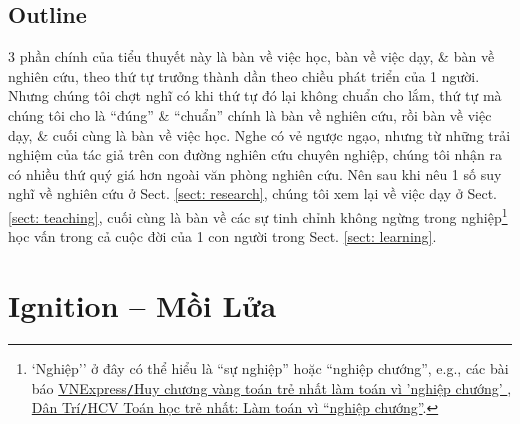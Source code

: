 \documentclass[12pt]{article}
\begin{document}
\subsection{Outline}
3 phần chính của tiểu thuyết này là bàn về việc học, bàn về việc dạy, \& bàn về nghiên cứu, theo thứ tự trưởng thành dần theo chiều phát triển của 1 người. Nhưng chúng tôi chợt nghĩ có khi thứ tự đó lại không chuẩn cho lắm, thứ tự mà chúng tôi cho là ``đúng'' \& ``chuẩn'' chính là bàn về nghiên cứu, rồi bàn về việc dạy, \& cuối cùng là bàn về việc học. Nghe có vẻ ngược ngạo, nhưng từ những trải nghiệm của tác giả trên con đường nghiên cứu chuyên nghiệp, chúng tôi nhận ra có nhiều thứ quý giá hơn ngoài văn phòng nghiên cứu. Nên sau khi nêu 1 số suy nghĩ về nghiên cứu ở Sect. \ref{sect: research}, chúng tôi xem lại về việc dạy ở Sect. \ref{sect: teaching}, cuối cùng là bàn về các sự tinh chỉnh không ngừng trong nghiệp\footnote{`Nghiệp'' ở đây có thể hiểu là ``sự nghiệp'' hoặc ``nghiệp chướng'', e.g., các bài báo \href{https://vnexpress.net/huy-chuong-vang-toan-tre-nhat-lam-toan-vi-nghiep-chuong-2393718.html}{VNExpress{\tt/}Huy chương vàng toán trẻ nhất làm toán vì 'nghiệp chướng' }, \href{https://dantri.com.vn/giao-duc/hcv-toan-hoc-tre-nhat-lam-toan-vi-nghiep-chuong-1354447180.htm}{Dân Trí{\tt/}HCV Toán học trẻ nhất: Làm toán vì ``nghiệp chướng''}.} học vấn trong cả cuộc đời của 1 con người trong Sect. \ref{sect: learning}.

\section{Ignition -- Mồi Lửa}
\end{document}
